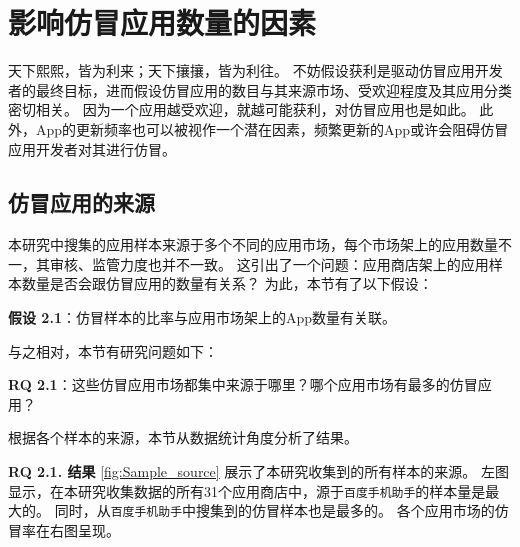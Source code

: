 \section{影响仿冒应用数量的因素}
\label{sec:quantitativeStudy}
天下熙熙，皆为利来；天下攘攘，皆为利往。
不妨假设获利是驱动仿冒应用开发者的最终目标，进而假设仿冒应用的数目与其来源市场、受欢迎程度及其应用分类密切相关。
因为一个应用越受欢迎，就越可能获利，对仿冒应用也是如此。
此外，App的更新频率也可以被视作一个潜在因素，频繁更新的App或许会阻碍仿冒应用开发者对其进行仿冒。

\subsection{仿冒应用的来源}

本研究中搜集的应用样本来源于多个不同的应用市场，每个市场架上的应用数量不一，其审核、监管力度也并不一致。
这引出了一个问题：应用商店架上的应用样本数量是否会跟仿冒应用的数量有关系？
为此，本节有了以下假设：

{\bf 假设 2.1}：仿冒样本的比率与应用市场架上的App数量有关联。

与之相对，本节有研究问题如下：

{\bf RQ 2.1}：这些仿冒应用市场都集中来源于哪里？哪个应用市场有最多的仿冒应用？

根据各个样本的来源，本节从数据统计角度分析了结果。

{\bf RQ 2.1. 结果} \autoref{fig:Sample_source} 展示了本研究收集到的所有样本的来源。
左图显示，在本研究收集数据的所有31个应用商店中，源于\texttt{百度手机助手}的样本量是最大的。
同时，从\texttt{百度手机助手}中搜集到的仿冒样本也是最多的。
各个应用市场的仿冒率在右图呈现。

